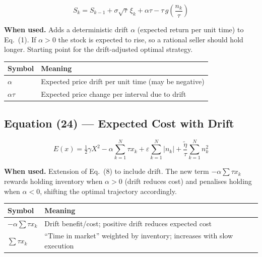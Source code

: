 \documentclass[11pt,a4paper]{article}
\begin{document}
\begin{equation}
  S_k = S_{k-1} + \sigma\sqrt{\tau}\,\xi_k + \alpha\tau - \tau\,g\!\left(\frac{n_k}{\tau}\right)
\end{equation}

\textbf{When used.} Adds a deterministic drift $\alpha$ (expected return per unit time)
to Eq.~(1).  If $\alpha>0$ the stock is expected to rise, so a rational seller should
hold longer.  Starting point for the drift-adjusted optimal strategy.

\begin{center}
\begin{tabular}{@{}L{3.5cm}L{10cm}@{}}
\toprule
\textbf{Symbol} & \textbf{Meaning} \\
\midrule
$\alpha$ & Expected price drift per unit time (may be negative) \\
$\alpha\tau$ & Expected price change per interval due to drift \\
\bottomrule
\end{tabular}
\end{center}

\subsection*{Equation (24) — Expected Cost with Drift}

\begin{equation}
  E(x) = \tfrac{1}{2}\gamma X^2
        - \alpha\sum_{k=1}^{N}\tau x_k
        + \varepsilon\sum_{k=1}^{N}|n_k|
        + \frac{\tilde{\eta}}{\tau}\sum_{k=1}^{N}n_k^2
\end{equation}

\textbf{When used.} Extension of Eq.~(8) to include drift.  The new term
$-\alpha\sum\tau x_k$ rewards holding inventory when $\alpha>0$ (drift reduces cost) and
penalises holding when $\alpha<0$, shifting the optimal trajectory accordingly.

\begin{center}
\begin{tabular}{@{}L{3.5cm}L{10cm}@{}}
\toprule
\textbf{Symbol} & \textbf{Meaning} \\
\midrule
$-\alpha\sum\tau x_k$ & Drift benefit/cost; positive drift reduces expected cost \\
$\sum\tau x_k$ & ``Time in market'' weighted by inventory; increases with slow execution \\
\bottomrule
\end{tabular}
\end{center}
\end{document}
